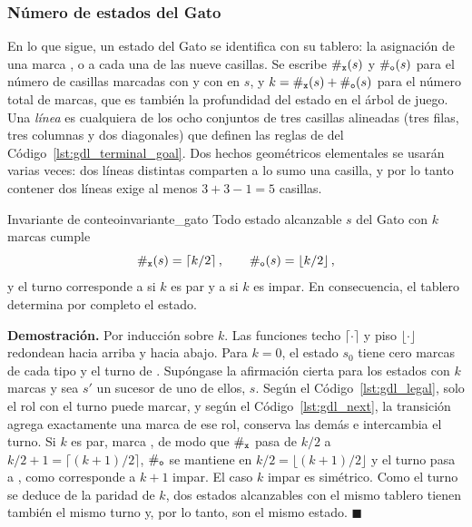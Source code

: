 \subsubsection{Número de estados del Gato}

En lo que sigue, un estado del Gato se identifica con su tablero: la asignación de una marca ,  o  a cada una de las nueve casillas. Se escribe $\#_{\texttt{x}}(s)$ y $\#_{\texttt{o}}(s)$ para el número de casillas marcadas con  y con  en $s$, y $k = \#_{\texttt{x}}(s) + \#_{\texttt{o}}(s)$ para el número total de marcas, que es también la profundidad del estado en el árbol de juego. Una \emph{línea} es cualquiera de los ocho conjuntos de tres casillas alineadas (tres filas, tres columnas y dos diagonales) que definen las reglas de  del Código~\ref{lst:gdl_terminal_goal}. Dos hechos geométricos elementales se usarán varias veces: dos líneas distintas comparten a lo sumo una casilla, y por lo tanto contener dos líneas exige al menos $3 + 3 - 1 = 5$ casillas.

\begin{proposicion}{Invariante de conteo}{invariante_gato}
Todo estado alcanzable $s$ del Gato con $k$ marcas cumple
\begin{equation}
    \#_{\texttt{x}}(s) = \left\lceil k/2 \right\rceil, \qquad \#_{\texttt{o}}(s) = \left\lfloor k/2 \right\rfloor,
    \label{eq:an_invariante}
\end{equation}
y el turno corresponde a  si $k$ es par y a  si $k$ es impar. En consecuencia, el tablero determina por completo el estado.
\end{proposicion}

\noindent\textbf{Demostración.} Por inducción sobre $k$. Las funciones techo $\lceil \cdot \rceil$ y piso $\lfloor \cdot \rfloor$ redondean hacia arriba y hacia abajo. Para $k = 0$, el estado $s_0$ tiene cero marcas de cada tipo y el turno de . Supóngase la afirmación cierta para los estados con $k$ marcas y sea $s'$ un sucesor de uno de ellos, $s$. Según el Código~\ref{lst:gdl_legal}, solo el rol con el turno puede marcar, y según el Código~\ref{lst:gdl_next}, la transición agrega exactamente una marca de ese rol, conserva las demás e intercambia el turno. Si $k$ es par, marca , de modo que $\#_{\texttt{x}}$ pasa de $k/2$ a $k/2 + 1 = \lceil (k+1)/2 \rceil$, $\#_{\texttt{o}}$ se mantiene en $k/2 = \lfloor (k+1)/2 \rfloor$ y el turno pasa a , como corresponde a $k+1$ impar. El caso $k$ impar es simétrico. Como el turno se deduce de la paridad de $k$, dos estados alcanzables con el mismo tablero tienen también el mismo turno y, por lo tanto, son el mismo estado. \hfill $\blacksquare$

